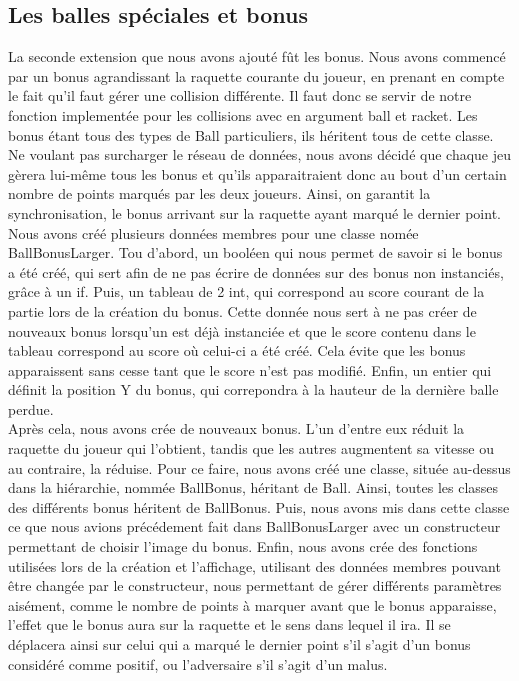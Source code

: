\subsection{Les balles spéciales et bonus}
La seconde extension que nous avons ajouté fût les bonus. Nous avons commencé par un bonus agrandissant 
la raquette courante du joueur, en prenant en compte le fait qu'il faut gérer une collision différente. 
Il faut donc se servir 
de notre fonction implementée pour les collisions avec en argument
ball et racket. Les bonus étant tous des types de Ball particuliers, ils héritent tous de cette classe. 
\\
Ne voulant pas surcharger le réseau de données, nous avons décidé que chaque jeu gèrera lui-même tous 
les bonus et qu'ils apparaitraient
donc au bout d'un certain nombre de points marqués par les deux joueurs. Ainsi, on garantit 
la synchronisation, le bonus arrivant sur la raquette 
ayant marqué le dernier
point.
\\
Nous avons créé plusieurs données membres pour une classe nomée BallBonusLarger. Tou d'abord, un booléen qui nous 
permet de savoir si le bonus a été créé, qui sert afin de ne pas écrire de données sur des bonus non 
instanciés, grâce à un if.
Puis, un tableau de 2 int, qui correspond au score courant de la partie lors de la création du bonus. Cette donnée 
nous sert à ne pas créer de nouveaux bonus lorsqu'un est déjà instanciée et que le score contenu dans le tableau 
correspond au score où celui-ci a été créé. Cela évite que les bonus apparaissent sans cesse tant que le score n'est pas 
modifié. 
Enfin, un entier qui définit la position Y du bonus, qui correpondra à la hauteur de la dernière balle perdue.
\\
Après cela, nous avons crée de nouveaux bonus. L'un d'entre eux réduit la raquette du joueur qui l'obtient, tandis que 
les autres augmentent sa vitesse ou au contraire, la réduise. 
Pour ce faire, nous avons créé une classe, située au-dessus dans la hiérarchie, nommée 
BallBonus, héritant de Ball. Ainsi, toutes les classes des 
différents bonus héritent de BallBonus. 
Puis, nous avons mis dans cette classe ce que nous avions précédement fait dans 
BallBonusLarger avec un 
constructeur permettant de choisir l'image du bonus. Enfin, nous avons crée des fonctions utilisées lors 
de la création et l'affichage,
utilisant des données membres pouvant être changée par le constructeur, nous permettant de gérer différents paramètres aisément, 
comme le nombre de points à marquer avant que le bonus apparaisse, l'effet que le bonus aura sur la raquette et le sens 
dans lequel il ira. Il se déplacera ainsi sur celui qui a marqué le dernier point s'il s'agit d'un bonus 
considéré comme positif, ou l'adversaire s'il s'agit d'un malus.

